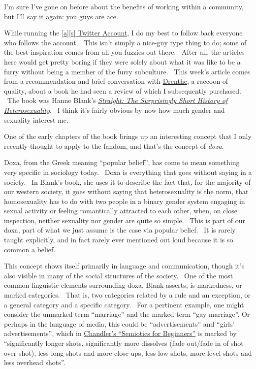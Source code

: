 I'm sure I've gone on before about the benefits of working within a
community, but I'll say it again: you guys are ace.

While running the \href{http://twitter.com/adjspecies}{{[}a{]}{[}s{]}
Twitter Account}, I do my best to follow back everyone who follows the
account. ~This isn't simply a nice-guy type thing to do; some of the
best inspiration comes from all you fuzzies out there. ~After all, the
articles here would get pretty boring if they were solely about what it
was like to be a furry without being a member of the furry subculture.
~This week's article comes from a recommendation and brief conversation
with \href{https://twitter.com/itsdrenthe}{Drenthe}, a raccoon of
quality, about a book he had seen a review of which I subsequently
purchased. ~The book was Hanne Blank's
\href{http://www.amazon.com/gp/product/0807044431/}{\emph{Straight: The
Surprisingly Short History of Heterosexuality}}. ~I think it's fairly
obvious by now how much gender and sexuality interest me.

One of the early chapters of the book brings up an interesting concept
that I only recently thought to apply to the fandom, and that's the
concept of \emph{doxa}.

Doxa, from the Greek meaning ``popular belief'', has come to mean
something very specific in sociology today. ~Doxa is everything that
goes without saying in a society. ~In Blank's book, she uses it to
describe the fact that, for the majority of our western society, it goes
without saying that heterosexuality is the norm, that homosexuality has
to do with two people in a binary gender system engaging in sexual
activity or feeling romantically attracted to each other, when, on close
inspection, neither sexuality nor gender are quite so simple. ~This is
part of our doxa, part of what we just assume is the case via popular
belief. ~It is rarely taught explicitly, and in fact rarely ever
mentioned out loud because it is so common a belief.

This concept shows itself primarily in language and communication,
though it's also visible in many of the social structures of the
society. ~One of the most common linguistic elements surrounding doxa,
Blank asserts, is markedness, or marked categories. ~That is, two
categories related by a rule and an exception, or a general category and
a specific category. ~For a pertinent example, one might consider the
unmarked term ``marriage'' and the marked term ``gay marriage''. Or
perhaps in the language of media, this could be ``advertisements'' and
``girls' advertisements'', which in
\href{http://www.aber.ac.uk/media/Documents/S4B/sem05.html}{Chandler's
``Semiotics for Beginners''} is marked by ``significantly longer shots,
significantly more dissolves (fade out/fade in of shot over shot), less
long shots and more close-ups, less low shots, more level shots and less
overhead shots''.

